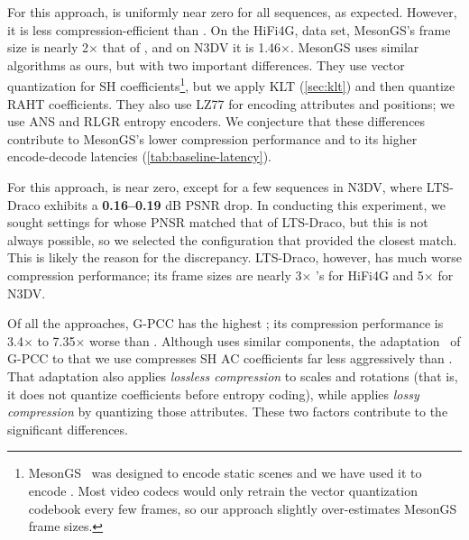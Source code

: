 %
For this approach, \dpsnr{} is uniformly near zero for all sequences, as expected.
%
However, it is less compression-efficient than \gsnfs{}.
%
On the HiFi4G, data set, MesonGS's frame size is nearly 2$\times$ that of \gsnfs{}, and on N3DV it is 1.46$\times$.
%
MesonGS uses similar algorithms as ours, but with two important differences.
%
They use vector quantization for SH coefficients\footnote{MesonGS~\cite{mesongs} was designed to encode static scenes and we have used it to encode \dgs{}. Most video codecs would only retrain the vector quantization codebook every few frames, so our approach slightly over-estimates MesonGS frame sizes.}, but we apply KLT (\cref{sec:klt}) and then quantize RAHT coefficients.
%
They also use LZ77 for encoding attributes and positions; we use ANS and RLGR entropy encoders.
%
We conjecture that these differences contribute to MesonGS's lower compression performance and to its higher encode-decode latencies (\cref{tab:baseline-latency}).

%
For this approach, \dpsnr{} is near zero, except for a few sequences in N3DV, where LTS-Draco exhibits a \textbf{0.16--0.19} dB PSNR drop.
%
In conducting this experiment, we sought settings for \gsnfs{} whose PNSR matched that of LTS-Draco, but this is not always possible, so we selected the configuration that provided the closest match.
%
This is likely the reason for the discrepancy.
%
LTS-Draco, however, has much worse compression performance; its frame sizes are nearly 3$\times$ \gsnfs{}'s for HiFi4G and 5$\times$ for N3DV.

%
Of all the approaches, G-PCC has the highest \rcr{}; its compression performance is 3.4$\times$ to 7.35$\times$ worse than \gsnfs{}.
%
Although \gsnfs{} uses similar components, the adaptation~\cite{gpcc-adaptive} of G-PCC to \dgs{} that we use compresses SH AC coefficients far less aggressively than \gsnfs{}.
%
That adaptation also applies \textit{lossless compression} to scales and rotations (that is, it does not quantize coefficients before entropy coding), while \gsnfs{} applies \textit{lossy compression} by quantizing those attributes.
%
These two factors contribute to the significant differences.

